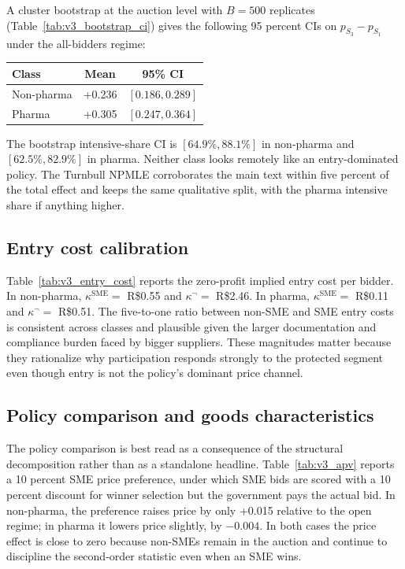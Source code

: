 A cluster bootstrap at the auction level with $B=500$ replicates (Table~\ref{tab:v3_bootstrap_ci}) gives the following 95 percent CIs on $p_{S_3} - p_{S_1}$ under the all-bidders regime:
\begin{center}
\begin{tabular}{lcc}
\toprule
Class      & Mean   & 95\% CI \\
\midrule
Non-pharma & +0.236 & $[0.186, 0.289]$ \\
Pharma     & +0.305 & $[0.247, 0.364]$ \\
\bottomrule
\end{tabular}
\end{center}
The bootstrap intensive-share CI is $[64.9\%, 88.1\%]$ in non-pharma and $[62.5\%, 82.9\%]$ in pharma. Neither class looks remotely like an entry-dominated policy. The Turnbull NPMLE corroborates the main text within five percent of the total effect and keeps the same qualitative split, with the pharma intensive share if anything higher.

\subsection{Entry cost calibration}

Table~\ref{tab:v3_entry_cost} reports the zero-profit implied entry cost per bidder. In non-pharma, $\kappa^{\text{SME}} =$ R\$0.55 and $\kappa^{\neg} =$ R\$2.46. In pharma, $\kappa^{\text{SME}} =$ R\$0.11 and $\kappa^{\neg} =$ R\$0.51. The five-to-one ratio between non-SME and SME entry costs is consistent across classes and plausible given the larger documentation and compliance burden faced by bigger suppliers. These magnitudes matter because they rationalize why participation responds strongly to the protected segment even though entry is not the policy's dominant price channel.

\subsection{Policy comparison and goods characteristics}\label{sec:pareto}

The policy comparison is best read as a consequence of the structural decomposition rather than as a standalone headline. Table~\ref{tab:v3_apv} reports a 10 percent SME price preference, under which SME bids are scored with a 10 percent discount for winner selection but the government pays the actual bid. In non-pharma, the preference raises price by only +0.015 relative to the open regime; in pharma it lowers price slightly, by $-0.004$. In both cases the price effect is close to zero because non-SMEs remain in the auction and continue to discipline the second-order statistic even when an SME wins.

